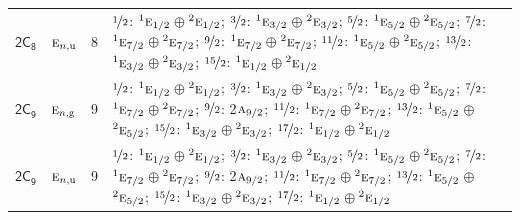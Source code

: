 \documentclass[10pt,a4paper]{article}
\numberwithin{equation}{section}
\newcommand{\grp}[1]{\mathsf{#1}}
\newcommand{\irr}[1]{\text{\normalfont\scshape #1}}
\newcommand{\conjpair}[1]{{}^{#1}}
\newcommand{\ptag}[1]{\mathrm{#1}}
\newlength{\fillwidth}\newlength{\cellwidth}\newlength{\colwidth}
\begin{document}
{\begin{longtable}{@{}llr>{\RaggedRight\arraybackslash}p{\fillwidth}@{}}
\href{2C8.pdf}{$\grp{2C_{8}}$} & $\irr{e}_{n,\ptag{u}}$ & 8 & $\nicefrac{1}{2}$: $\conjpair{1}\irr{e}_{1/2}$${}\oplus{}$$\conjpair{2}\irr{e}_{1/2}$; $\nicefrac{3}{2}$: $\conjpair{1}\irr{e}_{3/2}$${}\oplus{}$$\conjpair{2}\irr{e}_{3/2}$; $\nicefrac{5}{2}$: $\conjpair{1}\irr{e}_{5/2}$${}\oplus{}$$\conjpair{2}\irr{e}_{5/2}$; $\nicefrac{7}{2}$: $\conjpair{1}\irr{e}_{7/2}$${}\oplus{}$$\conjpair{2}\irr{e}_{7/2}$; $\nicefrac{9}{2}$: $\conjpair{1}\irr{e}_{7/2}$${}\oplus{}$$\conjpair{2}\irr{e}_{7/2}$; $\nicefrac{11}{2}$: $\conjpair{1}\irr{e}_{5/2}$${}\oplus{}$$\conjpair{2}\irr{e}_{5/2}$; $\nicefrac{13}{2}$: $\conjpair{1}\irr{e}_{3/2}$${}\oplus{}$$\conjpair{2}\irr{e}_{3/2}$; $\nicefrac{15}{2}$: $\conjpair{1}\irr{e}_{1/2}$${}\oplus{}$$\conjpair{2}\irr{e}_{1/2}$\\
\href{2C9.pdf}{$\grp{2C_{9}}$} & $\irr{e}_{n,\ptag{g}}$ & 9 & $\nicefrac{1}{2}$: $\conjpair{1}\irr{e}_{1/2}$${}\oplus{}$$\conjpair{2}\irr{e}_{1/2}$; $\nicefrac{3}{2}$: $\conjpair{1}\irr{e}_{3/2}$${}\oplus{}$$\conjpair{2}\irr{e}_{3/2}$; $\nicefrac{5}{2}$: $\conjpair{1}\irr{e}_{5/2}$${}\oplus{}$$\conjpair{2}\irr{e}_{5/2}$; $\nicefrac{7}{2}$: $\conjpair{1}\irr{e}_{7/2}$${}\oplus{}$$\conjpair{2}\irr{e}_{7/2}$; $\nicefrac{9}{2}$: 2$\irr{a}_{9/2}$; $\nicefrac{11}{2}$: $\conjpair{1}\irr{e}_{7/2}$${}\oplus{}$$\conjpair{2}\irr{e}_{7/2}$; $\nicefrac{13}{2}$: $\conjpair{1}\irr{e}_{5/2}$${}\oplus{}$$\conjpair{2}\irr{e}_{5/2}$; $\nicefrac{15}{2}$: $\conjpair{1}\irr{e}_{3/2}$${}\oplus{}$$\conjpair{2}\irr{e}_{3/2}$; $\nicefrac{17}{2}$: $\conjpair{1}\irr{e}_{1/2}$${}\oplus{}$$\conjpair{2}\irr{e}_{1/2}$\\
\href{2C9.pdf}{$\grp{2C_{9}}$} & $\irr{e}_{n,\ptag{u}}$ & 9 & $\nicefrac{1}{2}$: $\conjpair{1}\irr{e}_{1/2}$${}\oplus{}$$\conjpair{2}\irr{e}_{1/2}$; $\nicefrac{3}{2}$: $\conjpair{1}\irr{e}_{3/2}$${}\oplus{}$$\conjpair{2}\irr{e}_{3/2}$; $\nicefrac{5}{2}$: $\conjpair{1}\irr{e}_{5/2}$${}\oplus{}$$\conjpair{2}\irr{e}_{5/2}$; $\nicefrac{7}{2}$: $\conjpair{1}\irr{e}_{7/2}$${}\oplus{}$$\conjpair{2}\irr{e}_{7/2}$; $\nicefrac{9}{2}$: 2$\irr{a}_{9/2}$; $\nicefrac{11}{2}$: $\conjpair{1}\irr{e}_{7/2}$${}\oplus{}$$\conjpair{2}\irr{e}_{7/2}$; $\nicefrac{13}{2}$: $\conjpair{1}\irr{e}_{5/2}$${}\oplus{}$$\conjpair{2}\irr{e}_{5/2}$; $\nicefrac{15}{2}$: $\conjpair{1}\irr{e}_{3/2}$${}\oplus{}$$\conjpair{2}\irr{e}_{3/2}$; $\nicefrac{17}{2}$: $\conjpair{1}\irr{e}_{1/2}$${}\oplus{}$$\conjpair{2}\irr{e}_{1/2}$\\

\end{longtable}}
\end{document}
